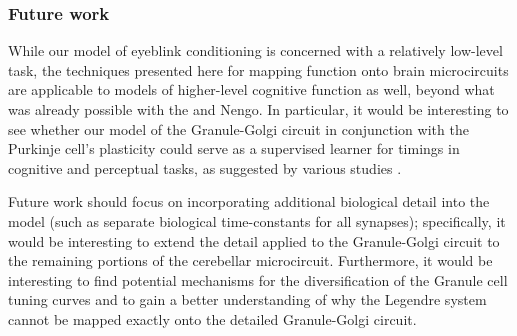 \subsubsection{Future work}
While our model of eyeblink conditioning is concerned with a relatively low-level task, the techniques presented here for mapping function onto brain microcircuits are applicable to models of higher-level cognitive function as well, beyond what was already possible with the \NEF and Nengo.
In particular, it would be interesting to see whether our model of the Granule-Golgi circuit in conjunction with the Purkinje cell's plasticity could serve as a supervised learner for timings in cognitive and perceptual tasks, as suggested by various studies \citep{oreilly2008cerebellum,e2014metaanalysis,sanger2020expansion}.

Future work should focus on incorporating additional biological detail into the model (such as separate biological time-constants for all synapses); specifically, it would be interesting to extend the detail applied to the Granule-Golgi circuit to the remaining portions of the cerebellar microcircuit.
Furthermore, it would be interesting to find potential mechanisms for the diversification of the Granule cell tuning curves and to gain a better understanding of why the Legendre system cannot be mapped exactly onto the detailed Granule-Golgi circuit.
